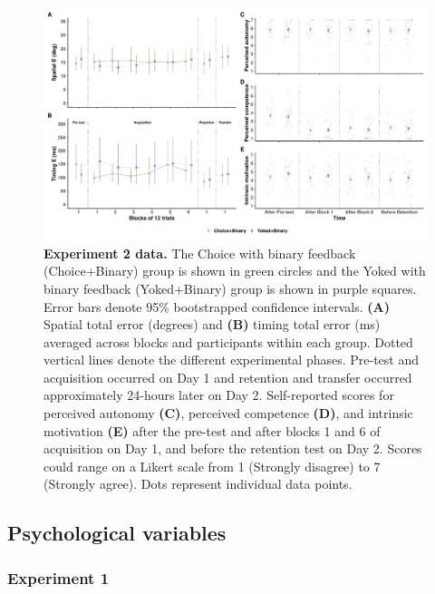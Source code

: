 \documentclass[
  man, donotrepeattitle,floatsintext]{apa7}
\begin{document}
\vspace{2ex}

\begin{figure}

{\centering \includegraphics{../../figs/fig3} 

}

\caption{\small \onehalfspacing \textbf{Experiment 2 data.} The Choice with binary feedback (Choice+Binary) group is shown in green circles and the Yoked with binary feedback (Yoked+Binary) group is shown in purple squares. Error bars denote 95\% bootstrapped confidence intervals. \textbf{(A)} Spatial total error (degrees) and \textbf{(B)} timing total error (ms) averaged across blocks and participants within each group. Dotted vertical lines denote the different experimental phases. Pre-test and acquisition occurred on Day 1 and retention and transfer occurred approximately 24-hours later on Day 2. Self-reported scores for perceived autonomy \textbf{(C)}, perceived competence \textbf{(D)}, and intrinsic motivation \textbf{(E)} after the pre-test and after blocks 1 and 6 of acquisition on Day 1, and before the retention test on Day 2. Scores could range on a Likert scale from 1 (Strongly disagree) to 7 (Strongly agree). Dots represent individual data points.}\label{fig:fig3}
\end{figure}



\hypertarget{psychological-variables}{%
\subsection{Psychological variables}\label{psychological-variables}}

\hypertarget{experiment-1-4}{%
\subsubsection{Experiment 1}\label{experiment-1-4}}
\end{document}
